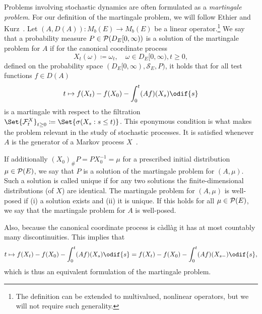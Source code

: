 Problems involving stochastic dynamics are often formulated as a \textit{martingale problem}.
For our definition of the martingale problem, we will follow Ethier and Kurz~\cite[p.174]{ethierMarkovProcessesCharacterization1985}.
Let \((A, D(A)) : M_b(E) \to M_b(E)\) be a linear operator.\footnote{The definition can be extended to multivalued, nonlinear operators, but we will not require such generality.}
We say that a probability measure \(P \in \mathcal{P}(D_E[0,\infty))\) is a solution of the martingale problem for \(A\) if for the canonical coordinate process
\begin{equation}
  X_t(\omega) \coloneqq \omega_t, \quad \omega \in D_E[0,\infty), t \geq 0,
\end{equation}
defined on the probability space \((D_E[0,\infty), \mathscr{S}_E, P)\), it holds that for all test functions \(f \in D(A)\)
\begin{equation}\label{eq:mart-problem}
  t \mapsto f(X_t) - f(X_0) - \int_0^t (Af)(X_s) \odif{s}
\end{equation}
is a martingale with respect to the filtration \(\Set{\cF_t^X}_{t\geq0} \coloneqq \Set{\sigma(X_s : s \leq t)}\). %
This eponymous condition is what makes the problem relevant in the study of stochastic processes.
It is satisfied whenever \(A\) is the generator of a Markov process \(X\)~\cite[161-162]{ethierMarkovProcessesCharacterization1985}.

If additionally \( (X_0)_\# P = P X_0^{-1} = \mu \) for a prescribed initial distribution \(\mu \in \mathcal{P}(E)\), we say that \(P\) is a solution of the martingale problem for \((A,\mu)\).
Such a solution is called unique if for any two solutions the finite-dimensional distributions (of \(X\)) are identical.
The martingale problem for \((A,\mu)\) is well-posed if (i) a solution exists and (ii) it is unique.
If this holds for all \(\mu \in \mathcal{P}(E)\), we say that the martingale problem for \(A\) is well-posed.

Also, because the canonical coordinate process is càdlàg it has at most countably many discontinuities.
This implies that
\begin{equation}\label{eq:mart-problem-s-}
  t \mapsto f(X_t) - f(X_0) - \int_0^t (Af)(X_s) \odif{s}
  = f(X_t) - f(X_0) - \int_0^t (Af)(X_{s-}) \odif{s},
\end{equation}
which is thus an equivalent formulation of the martingale problem.

